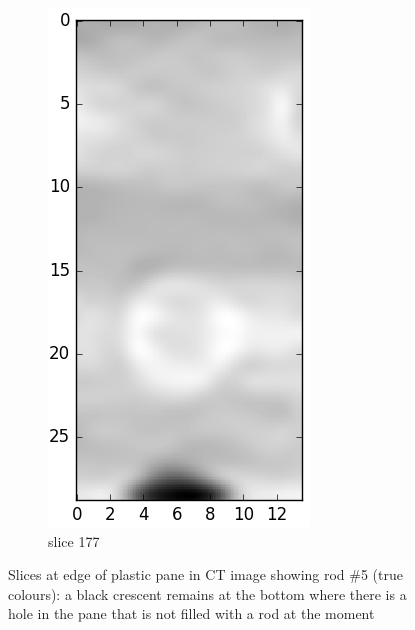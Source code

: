 \begin{figure}[!tbh]
\begin{subfigure}[b]{0.32\textwidth}
	\end{subfigure}
	\begin{subfigure}[b]{0.32\textwidth}
	  \includegraphics[width=\linewidth]{../fig/python/ph2/brightness/ph2_CT_pane@177}
	  \caption{slice 177}
	  \label{fig:ph2_CT_x100_pane_2}
	\end{subfigure}
  \caption{Slices at edge of plastic pane in CT image showing rod \#5 (true colours): a black crescent remains at the bottom where there is a hole in the pane that is not filled with a rod at the moment}
  \label{fig:ph2_CT_x100_pane}
\end{figure}


